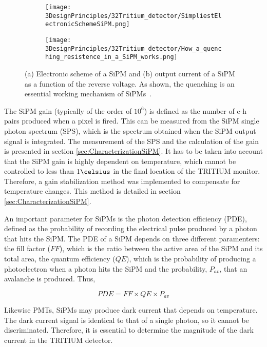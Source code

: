 \begin{figure}
\centering
    \begin{subfigure}[]{0.45\textwidth}
    \centering
    \texttt{[image: 3DesignPrinciples/32Tritium\_detector/SimpliestElectronicSchemeSiPM.png]}  
    \caption{\label{subfig:ElectricModelSiPM}}
    \end{subfigure}
    \hfill
    \begin{subfigure}[]{0.45\textwidth}
    \centering
    \texttt{[image: 3DesignPrinciples/32Tritium\_detector/How\_a\_quenching\_resistence\_in\_a\_SiPM\_works.png]}  
    \caption{\label{subfig:HowSiPMworks}}
    \end{subfigure}
 \caption{(a) Electronic scheme of a SiPM and (b) output current of a SiPM as a function of the reverse voltage. As shown, the quenching is an essential working mechanism of SiPMs~\cite{DataSheetSensL}.}
 \label{fig:ChenchingResistance}
\end{figure}

The SiPM gain (typically of the order of $10^6$) is defined as the number of e-h pairs produced when a pixel is fired. This can be measured from the SiPM single photon spectrum (SPS), which is the spectrum obtained when the SiPM output signal is integrated. The measurement of the SPS and the calculation of the gain is presented in section \ref{sec:CharacterizationSiPM}. It has to be taken into account that the SiPM gain is highly dependent on temperature, which cannot be controlled to less than $1\celsius$ in the final location of the TRITIUM monitor. Therefore, a gain stabilization method was implemented to compensate for temperature changes. This method is detailed in section \ref{sec:CharacterizationSiPM}.

An important parameter for SiPMs is the photon detection efficiency (PDE), defined as the probability of recording the electrical pulse produced by a photon that hits the SiPM. The PDE of a SiPM depends on three different paramenters: the fill factor ($FF$), which is the ratio between the active area of the SiPM and its total area, the quantum efficiency ($QE$), which is the probability of producing a photoelectron when a photon hits the SiPM and the probability, $P_{av}$, that an avalanche is produced. Thus, 

\begin{equation}
PDE=FF \times QE \times P_{av}
\label{PDE_SiPM}
\end{equation}

Likewise PMTs, SiPMs may produce dark current that depends on temperature. The dark current signal is identical to that of a single photon, so it cannot be discriminated. Therefore, it is essential to determine the magnitude of the dark current in the TRITIUM detector.

